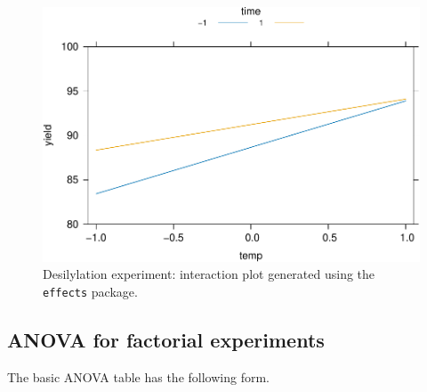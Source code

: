 \documentclass[
]{book}
\theoremstyle{definition}
\theoremstyle{definition}
\theoremstyle{definition}
\theoremstyle{definition}
\theoremstyle{remark}
\begin{document}
\begin{figure}
\centering
\includegraphics{bookdown_math3014-6027_files/figure-latex/desilylation-effects-1.pdf}
\caption{\label{fig:desilylation-effects}Desilylation experiment: interaction plot generated using the \texttt{effects} package.}
\end{figure}

\hypertarget{anova-for-factorial-experiments}{%
\subsection{ANOVA for factorial experiments}\label{anova-for-factorial-experiments}}

The basic ANOVA table has the following form.
\end{document}

